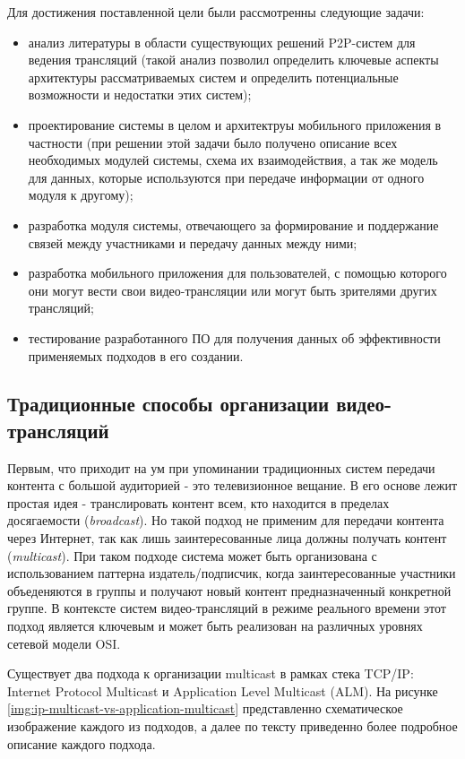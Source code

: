 	Для достижения поставленной цели были рассмотренны следующие задачи:
	\begin{itemize}
		\item анализ литературы в области существующих решений P2P-систем для ведения трансляций (такой анализ позволил
		определить ключевые аспекты архитектуры рассматриваемых систем и определить потенциальные возможности и
		недостатки этих систем);
		\item проектирование системы в целом и архитектруы мобильного приложения в частности (при решении этой задачи
		было получено описание всех необходимых модулей системы, схема их взаимодействия, а так же модель для данных,
		которые используются при передаче информации от одного модуля к другому);
		\item разработка модуля системы, отвечающего за формирование и поддержание связей между участниками и передачу
		данных между ними;
		\item разработка мобильного приложения для пользователей, с помощью которого они могут вести свои
		видео-трансляции или могут быть зрителями других трансляций;
		\item тестирование разработанного ПО для получения данных об эффективности применяемых подходов в его создании.
	\end{itemize}

	\subsection{Традиционные способы организации видео-трансляций}
	Первым, что приходит на ум при упоминании традиционных систем передачи контента с большой аудиторией - это
	телевизионное вещание. В его основе лежит простая идея - транслировать контент всем, кто находится в пределах
	досягаемости (\textit{broadcast}). Но такой подход не применим для передачи контента через Интернет, так как лишь
	заинтересованные лица должны получать контент (\textit{multicast}). При таком подходе система может быть
	организована с использованием паттерна издатель/подписчик, когда заинтересованные участники объеденяются в группы и
	получают новый контент предназначенный конкретной группе. В контексте систем видео-трансляций в режиме реального
	времени этот подход является ключевым и может быть реализован на различных уровнях сетевой модели OSI.

	Существует два подхода к организации multicast в рамках стека TCP/IP: Internet Protocol Multicast и Application
	Level Multicast (ALM). На рисунке \ref{img:ip-multicast-vs-application-multicast} представленно схематическое
	изображение каждого из подходов, а далее по тексту приведенно более подробное описание каждого подхода.

